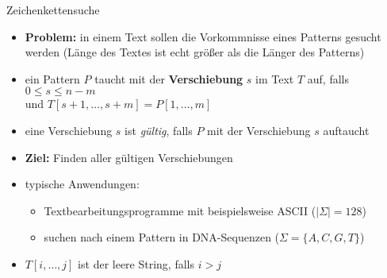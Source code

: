 \begin{TOP}{Zeichenkettensuche}
	\up\up\begin{itemize}[itemsep=-1pt]
		\item \textbf{Problem:} in einem Text sollen die Vorkommnisse eines Patterns gesucht werden (Länge des Textes ist echt größer als die Länger des Patterns)
		\item ein Pattern $P$ taucht mit der \textbf{Verschiebung} $s$ im Text $T$ auf, falls $0\leq s\leq n-m$\\
		und $T[s+1,\dots,s+m]= P[1,\dots,m]$
		\item eine Verschiebung $s$ ist \textit{gültig}, falls $P$ mit der Verschiebung $s$ auftaucht
		\item \textbf{Ziel:} Finden aller gültigen Verschiebungen
		\item typische Anwendungen:
			\begin{itemize}
				\item Textbearbeitungsprogramme mit beispielsweise ASCII ($|\Sigma|=128$)
				\item suchen nach einem Pattern in DNA-Sequenzen ($\Sigma=\{A,C,G,T\}$)
			\end{itemize}
		\item $T[i,\dots,j]$ ist der leere String, falls $i>j$
	\end{itemize}
	\topbreak
	\topbreak
\end{TOP}